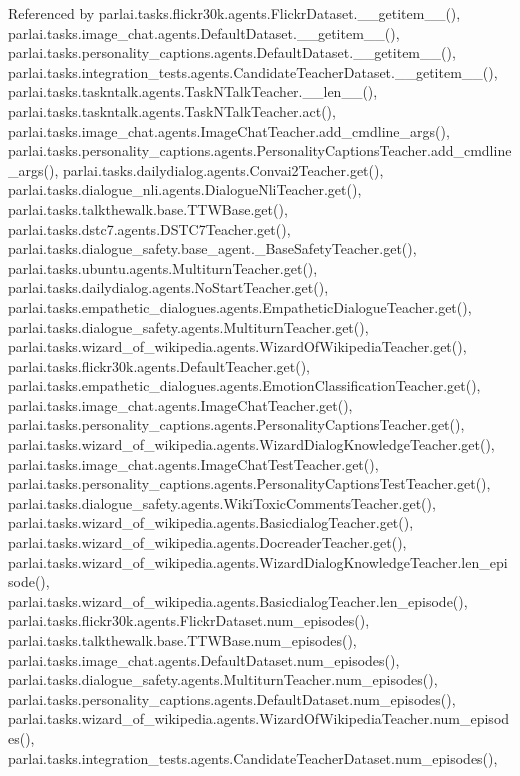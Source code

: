 Referenced by parlai.\+tasks.\+flickr30k.\+agents.\+Flickr\+Dataset.\+\_\+\+\_\+getitem\+\_\+\+\_\+(), parlai.\+tasks.\+image\+\_\+chat.\+agents.\+Default\+Dataset.\+\_\+\+\_\+getitem\+\_\+\+\_\+(), parlai.\+tasks.\+personality\+\_\+captions.\+agents.\+Default\+Dataset.\+\_\+\+\_\+getitem\+\_\+\+\_\+(), parlai.\+tasks.\+integration\+\_\+tests.\+agents.\+Candidate\+Teacher\+Dataset.\+\_\+\+\_\+getitem\+\_\+\+\_\+(), parlai.\+tasks.\+taskntalk.\+agents.\+Task\+N\+Talk\+Teacher.\+\_\+\+\_\+len\+\_\+\+\_\+(), parlai.\+tasks.\+taskntalk.\+agents.\+Task\+N\+Talk\+Teacher.\+act(), parlai.\+tasks.\+image\+\_\+chat.\+agents.\+Image\+Chat\+Teacher.\+add\+\_\+cmdline\+\_\+args(), parlai.\+tasks.\+personality\+\_\+captions.\+agents.\+Personality\+Captions\+Teacher.\+add\+\_\+cmdline\+\_\+args(), parlai.\+tasks.\+dailydialog.\+agents.\+Convai2\+Teacher.\+get(), parlai.\+tasks.\+dialogue\+\_\+nli.\+agents.\+Dialogue\+Nli\+Teacher.\+get(), parlai.\+tasks.\+talkthewalk.\+base.\+T\+T\+W\+Base.\+get(), parlai.\+tasks.\+dstc7.\+agents.\+D\+S\+T\+C7\+Teacher.\+get(), parlai.\+tasks.\+dialogue\+\_\+safety.\+base\+\_\+agent.\+\_\+\+Base\+Safety\+Teacher.\+get(), parlai.\+tasks.\+ubuntu.\+agents.\+Multiturn\+Teacher.\+get(), parlai.\+tasks.\+dailydialog.\+agents.\+No\+Start\+Teacher.\+get(), parlai.\+tasks.\+empathetic\+\_\+dialogues.\+agents.\+Empathetic\+Dialogue\+Teacher.\+get(), parlai.\+tasks.\+dialogue\+\_\+safety.\+agents.\+Multiturn\+Teacher.\+get(), parlai.\+tasks.\+wizard\+\_\+of\+\_\+wikipedia.\+agents.\+Wizard\+Of\+Wikipedia\+Teacher.\+get(), parlai.\+tasks.\+flickr30k.\+agents.\+Default\+Teacher.\+get(), parlai.\+tasks.\+empathetic\+\_\+dialogues.\+agents.\+Emotion\+Classification\+Teacher.\+get(), parlai.\+tasks.\+image\+\_\+chat.\+agents.\+Image\+Chat\+Teacher.\+get(), parlai.\+tasks.\+personality\+\_\+captions.\+agents.\+Personality\+Captions\+Teacher.\+get(), parlai.\+tasks.\+wizard\+\_\+of\+\_\+wikipedia.\+agents.\+Wizard\+Dialog\+Knowledge\+Teacher.\+get(), parlai.\+tasks.\+image\+\_\+chat.\+agents.\+Image\+Chat\+Test\+Teacher.\+get(), parlai.\+tasks.\+personality\+\_\+captions.\+agents.\+Personality\+Captions\+Test\+Teacher.\+get(), parlai.\+tasks.\+dialogue\+\_\+safety.\+agents.\+Wiki\+Toxic\+Comments\+Teacher.\+get(), parlai.\+tasks.\+wizard\+\_\+of\+\_\+wikipedia.\+agents.\+Basicdialog\+Teacher.\+get(), parlai.\+tasks.\+wizard\+\_\+of\+\_\+wikipedia.\+agents.\+Docreader\+Teacher.\+get(), parlai.\+tasks.\+wizard\+\_\+of\+\_\+wikipedia.\+agents.\+Wizard\+Dialog\+Knowledge\+Teacher.\+len\+\_\+episode(), parlai.\+tasks.\+wizard\+\_\+of\+\_\+wikipedia.\+agents.\+Basicdialog\+Teacher.\+len\+\_\+episode(), parlai.\+tasks.\+flickr30k.\+agents.\+Flickr\+Dataset.\+num\+\_\+episodes(), parlai.\+tasks.\+talkthewalk.\+base.\+T\+T\+W\+Base.\+num\+\_\+episodes(), parlai.\+tasks.\+image\+\_\+chat.\+agents.\+Default\+Dataset.\+num\+\_\+episodes(), parlai.\+tasks.\+dialogue\+\_\+safety.\+agents.\+Multiturn\+Teacher.\+num\+\_\+episodes(), parlai.\+tasks.\+personality\+\_\+captions.\+agents.\+Default\+Dataset.\+num\+\_\+episodes(), parlai.\+tasks.\+wizard\+\_\+of\+\_\+wikipedia.\+agents.\+Wizard\+Of\+Wikipedia\+Teacher.\+num\+\_\+episodes(), parlai.\+tasks.\+integration\+\_\+tests.\+agents.\+Candidate\+Teacher\+Dataset.\+num\+\_\+episodes(), 